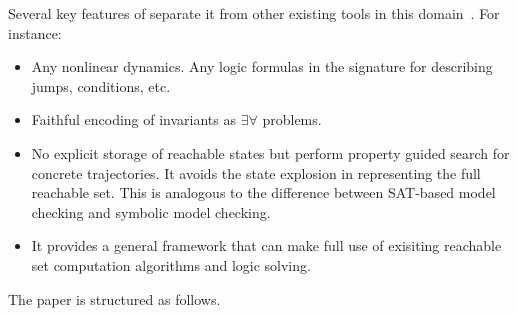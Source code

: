 Several key features of \dReach{} separate it from other existing tools in this domain~\cite{DBLP:journals/jlp/FranzleTE10,
DBLP:conf/icons/HerdeEFT08,DBLP:conf/cav/GulwaniT08,DBLP:conf/rtss/ChenAS12}. For instance:  
\begin{itemize}
\item Any nonlinear dynamics. Any logic formulas in the signature for describing jumps, conditions, etc.
\item Faithful encoding of invariants as $\exists\forall$ problems.
\item No explicit storage of reachable states but perform property guided search for concrete trajectories.
It avoids the state explosion in representing the full reachable set. This is analogous to the difference between SAT-based
model checking and symbolic model checking.
\item It provides a general framework that can make full use of exisiting reachable set computation algorithms and logic solving.
\end{itemize}


The paper is structured as follows.

\newpage
